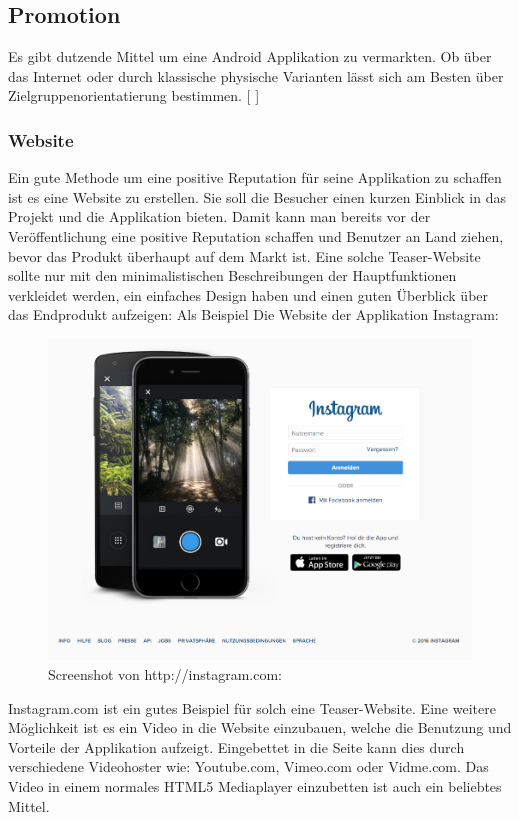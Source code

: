\documentclass[FIPLY_base.tex]{subfiles}
\begin{document}
\subsection{Promotion}
Es gibt dutzende Mittel um eine Android Applikation zu vermarkten. Ob über das Internet oder durch klassische physische Varianten lässt sich am Besten über Zielgruppenorientatierung bestimmen. 
[ \cite{promteil1}]

\subsubsection{Website}
Ein gute Methode um eine positive Reputation für seine Applikation zu schaffen ist es eine Website zu erstellen. Sie soll die Besucher einen kurzen Einblick in das Projekt und die Applikation bieten. Damit kann man bereits vor der Veröffentlichung eine positive Reputation schaffen und Benutzer an Land ziehen, bevor das Produkt überhaupt auf dem Markt ist. Eine solche Teaser-Website sollte nur mit den minimalistischen Beschreibungen der Hauptfunktionen verkleidet werden, ein einfaches Design haben und einen guten Überblick über das Endprodukt aufzeigen: Als Beispiel Die Website der Applikation Instagram:

\begin{figure}[H]
	\centering
	\includegraphics[scale=0.3]{img/instagramdotcom}
	\caption{Screenshot von http://instagram.com:}
\end{figure}

Instagram.com ist ein gutes Beispiel für solch eine Teaser-Website. 
Eine weitere Möglichkeit ist es ein Video in die Website einzubauen, welche die Benutzung und Vorteile der Applikation aufzeigt. Eingebettet in die Seite kann dies durch verschiedene Videohoster wie: Youtube.com, Vimeo.com oder Vidme.com. Das Video in einem normales HTML5 Mediaplayer einzubetten ist auch ein beliebtes Mittel.
\end{document}
